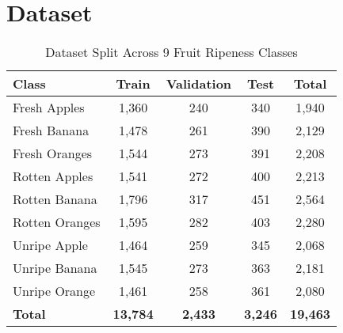 \documentclass[11pt,a4paper]{article}
\begin{document}
\section{Dataset}
\begin{table}[h]
\centering
\caption{Dataset Split Across 9 Fruit Ripeness Classes}
\label{tab:dataset_split}
\begin{tabular}{lcccc}
\hline
\textbf{Class} & \textbf{Train} & \textbf{Validation} & \textbf{Test} & \textbf{Total} \\
\hline
Fresh Apples & 1,360 & 240 & 340 & 1,940 \\
Fresh Banana & 1,478 & 261 & 390 & 2,129 \\
Fresh Oranges & 1,544 & 273 & 391 & 2,208 \\
Rotten Apples & 1,541 & 272 & 400 & 2,213 \\
Rotten Banana & 1,796 & 317 & 451 & 2,564 \\
Rotten Oranges & 1,595 & 282 & 403 & 2,280 \\
Unripe Apple & 1,464 & 259 & 345 & 2,068 \\
Unripe Banana & 1,545 & 273 & 363 & 2,181 \\
Unripe Orange & 1,461 & 258 & 361 & 2,080 \\
\hline
\textbf{Total} & \textbf{13,784} & \textbf{2,433} & \textbf{3,246} & \textbf{19,463} \\
\hline
\end{tabular}
\end{table}
\end{document}

